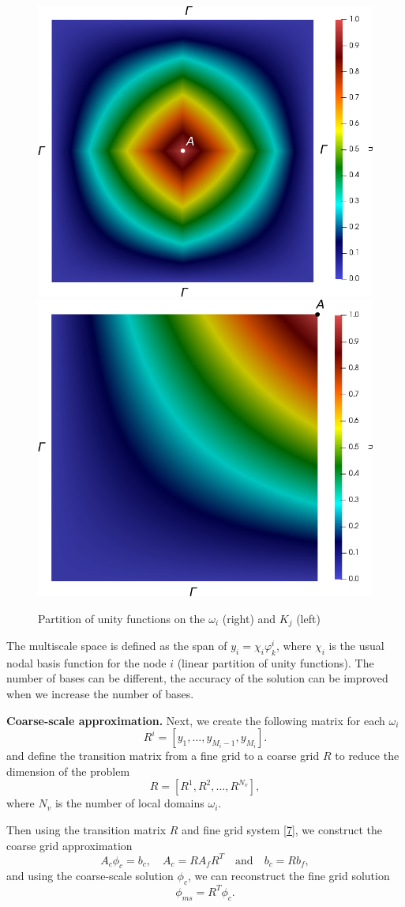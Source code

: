 \documentclass[preprint]{elsarticle}
\begin{document}
\begin{figure}[ht]
	\centering
		\includegraphics[width=0.45\linewidth]{pofs.png} \hspace{2em}
		\includegraphics[width=0.45\linewidth]{pouK.png} 
	\caption{Partition of unity functions on the $\omega_i$ (right) and $K_j$ (left)}
	\label{pou}
\end{figure} 
 
The multiscale space is defined as the span of $y_i = \chi_i \varphi^i_k$, where $\chi_i$ is the usual nodal basis function for the node $i$ (linear partition of unity functions). 
The number of bases can be different, the accuracy of the solution can be improved when we increase the number of bases.

\textbf{Coarse-scale approximation.}
Next, we create the following matrix for each $\omega_i$
\[
	R^i = \left[ y_1, \dots, y_{M_i-1},  y_{M_i} \right].
\]
and define the transition matrix from a fine grid to a coarse grid $R$ to reduce the dimension of the problem
\[
	R = [R^1, R^2, \dots, R^{N_v}],
\]
where $N_v$ is the number of local domains $\omega_i$.

Then using the transition matrix $R$ and fine grid system \eqref{7}, we construct the coarse grid approximation
\[
	A_c \phi_c = b_c, \quad 
	A_c = R A_f R^T \quad 
	\text{and} \quad 
	b_c = R b_f,
\]
and using the coarse-scale solution $\phi_c$, we can reconstruct the fine grid solution 
\[
	\phi_{ms} = R^T \phi_c.
\]
\end{document}
